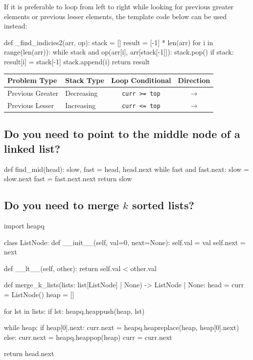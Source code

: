 \documentclass[12pt, titlepage]{article}
\begin{document}
If it is preferable to loop from left to right while looking for previous greater elements or previous lesser elements, the template code below can be used instead: \medskip

\begin{python}
def _find_indicies2(arr, op):
    stack = []
    result = [-1] * len(arr)
    for i in range(len(arr)):
        while stack and op(arr[i], arr[stack[-1]]):
            stack.pop()
        if stack:
            result[i] = stack[-1]
        stack.append(i)
    return result
\end{python} \medskip

\begin{center}
\begin{tabular}{|l|l|c|c|}
  \hline
  Problem Type & Stack Type & Loop Conditional & Direction \\
  \hline
  Previous Greater & Decreasing & \texttt{curr >= top} & $\rightarrow$ \\
  Previous Lesser & Increasing & \texttt{curr <= top} & $\rightarrow$ \\
  \hline
\end{tabular}
\end{center} \bigskip

\subsection{Do you need to point to the middle node of a linked list?}

\begin{python}
def find_mid(head):
    slow, fast = head, head.next
    while fast and fast.next:
        slow = slow.next
        fast = fast.next.next
    return slow
\end{python}

\subsection{Do you need to merge $k$ sorted lists?}

\begin{python}
import heapq

class ListNode:
    def __init__(self, val=0, next=None):
        self.val = val
        self.next = next

    def __lt__(self, other):
        return self.val < other.val

def merge_k_lists(lists: list[ListNode] | None) -> ListNode | None:
    head = curr = ListNode()
    heap = []

    for lst in lists:
        if lst:
            heapq.heappush(heap, lst)

    while heap:
        if heap[0].next:
            curr.next = heapq.heapreplace(heap, heap[0].next)
        else:
            curr.next = heapq.heappop(heap)
        curr = curr.next

    return head.next
\end{python}
\end{document}
